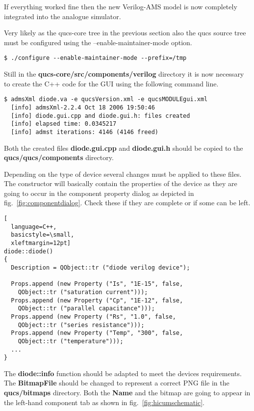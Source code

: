\addvspace{12pt}

If everything worked fine then the new Verilog-AMS model is now
completely integrated into the analogue simulator.


Very likely as the qucs-core tree in the previous section also the
qucs source tree must be configured using the --enable-maintainer-mode
option.
\begin{Verbatim}[fontsize=\small]
  $ ./configure --enable-maintainer-mode --prefix=/tmp
\end{Verbatim}

Still in the \textbf{qucs-core/src/components/verilog} directory it is
now necessary to create the C++ code for the GUI using the following
command line.

\begin{Verbatim}[fontsize=\small]
  $ admsXml diode.va -e qucsVersion.xml -e qucsMODULEgui.xml
  [info] admsXml-2.2.4 Oct 18 2006 19:50:46
  [info] diode.gui.cpp and diode.gui.h: files created
  [info] elapsed time: 0.0345217
  [info] admst iterations: 4146 (4146 freed)
\end{Verbatim}

Both the created files \textbf{diode.gui.cpp} and \textbf{diode.gui.h}
should be copied to the \textbf{qucs/qucs/components} directory.

\addvspace{12pt}

Depending on the type of device several changes must be applied to
these files.  The constructor will basically contain the properties of
the device as they are going to occur in the component property dialog
as depicted in fig.~\ref{fig:componentdialog}.  Check these if they
are complete or if some can be left.
\begin{lstlisting}[
  language=C++,
  basicstyle=\small,
  xleftmargin=12pt]
diode::diode()
{
  Description = QObject::tr ("diode verilog device");

  Props.append (new Property ("Is", "1E-15", false,
    QObject::tr ("saturation current")));
  Props.append (new Property ("Cp", "1E-12", false,
    QObject::tr ("parallel capacitance")));
  Props.append (new Property ("Rs", "1.0", false,
    QObject::tr ("series resistance")));
  Props.append (new Property ("Temp", "300", false,
    QObject::tr ("temperature")));
  ...
}
\end{lstlisting}

The \textbf{diode::info} function should be adapted to meet the
devices requirements.  The \textbf{BitmapFile} should be changed to
represent a correct PNG file in the \textbf{qucs/bitmaps} directory.
Both the \textbf{Name} and the bitmap are going to appear in the
left-hand component tab as shown in fig.~\ref{fig:hicumschematic}.

